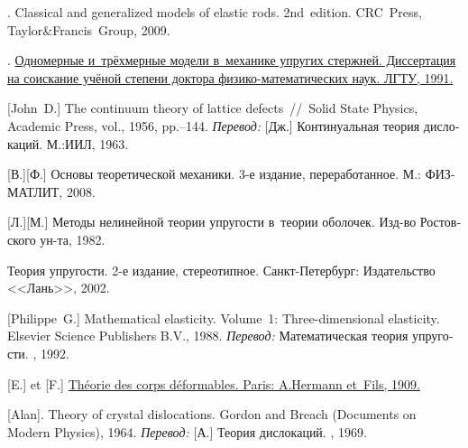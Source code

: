 \begin{thebibliography}{123}
\begin{otherlanguage}{russian}
.
Classical and generalized models of elastic rods.
2nd~edition.
CRC~Press, Taylor\:\&\:Francis~Group,
2009.

.
\href{https://www.researchgate.net/publication/320895320_Odnomernye_i_trehmernye_modeli_v_mehanike_uprugih_sterznej}%
{Одномерные и~трёхмерные модели в~механике упругих стержней.
Диссертация
на соискание
учёной степени
доктора
физико-математических наук.
ЛГТУ, 1991.}

[John~D.]
The continuum theory of lattice defects~//~Solid State Physics,
Academic Press,
vol., 1956,
pp.\hbox{--}144.
\emph{Перевод:}
[Дж.]
Континуальная теория дислокаций.
М.:\;ИИЛ,
1963.

[В.][Ф.]
Основы теоретической механики.
3-е издание, переработанное.
М.: ФИЗМАТЛИТ,
2008.

[Л.][М.]
Методы нелинейной теории упругости в~теории оболочек.
Изд\hbox{-}во Ростовского ун\hbox{-}та, 1982.

Теория упругости.
2-е издание, стереотипное.
{Санкт-Петербург}:
Издательство <<Лань>>, 2002.

[Philippe~G.]
Mathematical elasticity.
Volume~1\:: Three\hbox{-}dimensional elasticity.
Elsevier Science Publishers \hbox{B.\hspace{.1ex}V\hspace{-0.2ex}.},
1988.
\emph{Перевод:}
Математическая теория упругости.
\mirpublisher,
1992.

[E.] et [F.]
\href{
   https://jscholarship.library.jhu.edu/bitstream/handle/1774.2/34209/31151000327233.pdf
}{
   Théorie des corps déformables.
   Paris:
   A.\:Hermann et~Fils,
   1909.
}

[Alan].
Theory of crystal dislocations.
Gordon and Breach
(Documents on Modern Physics),
1964.
\emph{Перевод:}
[А.]
Теория дислокаций.
\mirpublisher, 1969.


\end{otherlanguage}
\end{thebibliography}
